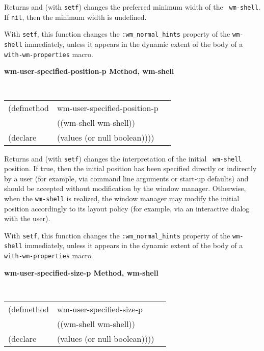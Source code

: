 \begin{flushright} \parbox[t]{6.125in}{
Returns and (with {\tt setf}) changes the preferred minimum width of the {\tt
wm-shell}. If {\tt nil}, then the minimum width is undefined. 

With {\tt setf}, this function changes the {\tt :wm\_normal\_hints} property of
the {\tt wm-shell} immediately, unless it appears in the dynamic extent of the
body of a {\tt with-wm-properties} macro.

}\end{flushright}


{\samepage
{\large {\bf wm-user-specified-position-p \hfill Method, wm-shell}}
\begin{flushright} \parbox[t]{6.125in}{
\tt
\begin{tabular}{lll}
\raggedright
(defmethod & wm-user-specified-position-p & \\
           & ((wm-shell  wm-shell)) \\
(declare   & (values (or null boolean))))
\end{tabular}
\rm

}\end{flushright}}

\begin{flushright} \parbox[t]{6.125in}{
Returns and (with {\tt setf}) changes the interpretation of the initial {\tt
wm-shell} position. If true, then the initial position has been specified
directly or indirectly by a user (for example, via command line arguments or
start-up defaults) and should be accepted without modification by the window
manager. Otherwise, when the {\tt wm-shell} is realized, the window manager may
modify the initial position accordingly to its layout policy (for example, via
an interactive dialog with the user).

With {\tt setf}, this function changes the {\tt :wm\_normal\_hints} property of
the {\tt wm-shell} immediately, unless it appears in the dynamic extent of the
body of a {\tt with-wm-properties} macro.

}\end{flushright}


{\samepage
{\large {\bf wm-user-specified-size-p \hfill Method, wm-shell}}
\begin{flushright} \parbox[t]{6.125in}{
\tt
\begin{tabular}{lll}
\raggedright
(defmethod & wm-user-specified-size-p & \\
           & ((wm-shell  wm-shell)) \\
(declare   & (values (or null boolean))))
\end{tabular}
\rm

}\end{flushright}}

